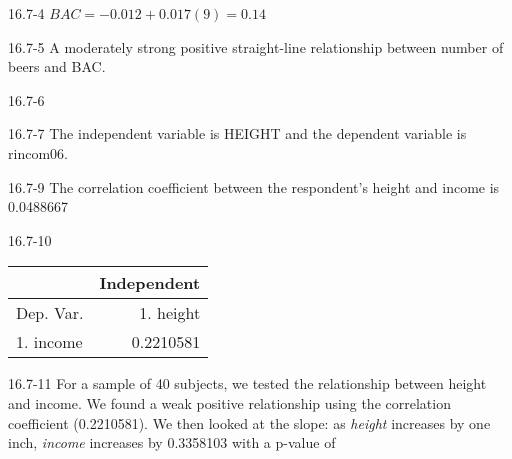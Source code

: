 \begin{exsol@solution}{16.7-4}
     $ BAC = -0.012 + 0.017 (9) = 0.14 $

\end{exsol@solution}
\begin{exsol@solution}{16.7-5}
    A moderately strong positive straight-line relationship between number of beers and BAC.

\end{exsol@solution}
\begin{exsol@solution}{16.7-6}

\end{exsol@solution}
\begin{exsol@solution}{16.7-7}
       The independent variable is HEIGHT and the dependent variable is rincom06.

\end{exsol@solution}
\begin{exsol@solution}{16.7-9}
       The correlation coefficient between the respondent's height and income is 0.0488667

\end{exsol@solution}
\begin{exsol@solution}{16.7-10}
       \begin{table}[ht]
    \centering
    \begin{tabular}{lr} \hline
        &  \multicolumn{1}{c}{Independent} \\ \hline

    Dep. Var. & 1. height      \\ \hline
    1. income  &   0.2210581      \\ \hline

    \end{tabular}
    \end{table}

\end{exsol@solution}
\begin{exsol@solution}{16.7-11}
    For a sample of 40 subjects, we tested the relationship between height and income.  We found a weak positive relationship using the correlation coefficient (0.2210581).  We then looked at the slope:  as {\textit{height}} increases by one inch, {\textit{income}} increases by 0.3358103 with a p-value of

\end{exsol@solution}

